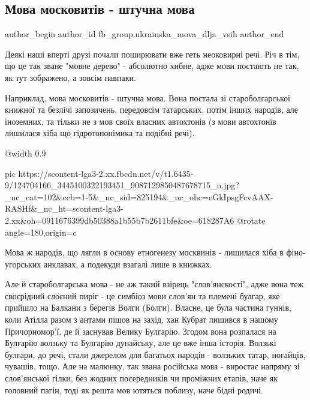  
 
 
 
 
 
\subsection{Мова московитів - штучна мова}
\label{sec:09_11_2020.fb.fb_group.ukrainska_mova_dlja_vsih.1.jazyk_moskovity_mova}
 
\ifcmt
 author_begin
   author_id fb_group.ukrainska_mova_dlja_vsih
 author_end
\fi

Деякі наші вперті друзі почали поширювати вже геть неоковирні речі. Річ в тім,
що це так зване "мовне дерево" - абсолютно хибне, адже мови постають не так, як
тут зображено, а зовсім навпаки.

Наприклад, мова московитів - штучна мова. Вона постала зі староболгарської
книжної та безлічі запозичень, передовсім татарських, потім інших народів, але
іноземних, та тільки не з мов своїх власних автохтонів (з мови автохтонів
лишилася хіба що гідротопонімика та подібні речі).

\ifcmt
  @width 0.9

  pic https://scontent-lga3-2.xx.fbcdn.net/v/t1.6435-9/124704166_3445100322193451_9087129850487678715_n.jpg?_nc_cat=102&ccb=1-5&_nc_sid=825194&_nc_ohc=eGkIpsgFcvAAX-RASHf&_nc_ht=scontent-lga3-2.xx&oh=0911676399db50388a1b55b7b2611bfe&oe=618287A6
	@rotate angle=180,origin=c
\fi

Мова ж народів, що лягли в основу етногенезу москвинів - лишилася хіба в
фіно-угорських анклавах, а подекуди взагалі лише в книжках.

Але й староболгарська мова - не аж такий взірець "слов'янскості", адже вона теж
своєрідний слоєний пиріг - це симбіоз мови слов'ян та племені булгар, яке
прийшло на Балкани з берегів Волги (Болги). Власне, це була частина гуннів,
коли Атілла разом з антами пішов на захід, хан Кубрат лишився в нашому
Причорномор'ї, де й заснував Велику Булгарію. Згодом вона розпалася на Булгарію
волзьку та Булгарію дунайську, але це вже інша історія. Волзькі булгари, до
речі, стали джерелом для багатьох народів - волзьких татар, ногайців, чувашів,
тощо. Але на малюнку, так звана російська мова - виростає напряму зі
слов'янської гілки, без жодних посередників чи проміжних етапів, наче як
головний пагін, тоді як решта мов ютяться поблизу, наче бідні родичі.

